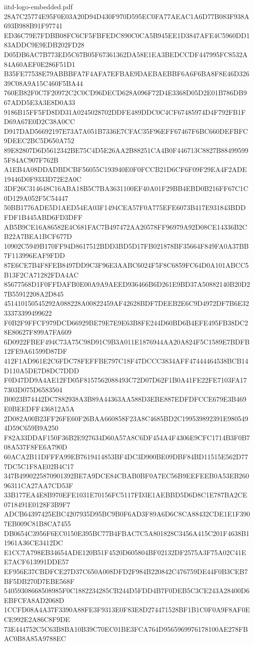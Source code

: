 \begin{filecontents*}[overwrite]{iitd-logo-embedded.pdf}
28A7C25774E95F0E03A20D94D430F970D595EC0FA77AEAC1A6D77B083F938A693B988B91F97741
ED36C79E7FDBB08FC6CF5FBFEDC890C0CA5B945EE1D3847AFE4C5960DD183ADDC9E9EDB202FD28
D05DB6AC7B773ED5C67B05F67361362DA58E1EA3BEDCCDF447995FC8532A84A60AEF0E286F51D1
B35FE77538E79ABBBFA7F4AFA7EFBAE9DAEBAEBBF6A6F6BA8F8E46D32639C08A9A15C460F5BA44
760EB82F0C7F20972C2C0CD96DECD628A096F72D4E3368D05D2E01B786DB967ADD5E3A3E8D0A33
9186B15FF5FD8DD31A0245028702DDFE489DDC0C4CF67485974D4F792FB1FD69A67E0D2C38A0CC
D917DAD56692197E73A7A051B7336E7CFAC35F96EFF67467F6BC660DEFBFC9DEEC2BC5D650A752
89E82807D6D5612342BE75C4D5E26AA2B88251CA4B0F446713C8827B884995995F84AC907F762B
A1EB4A08DDADBDCBF56055C193940E0F0FCCB21D6CF6F09F29EA4F2ADE19446D0F9333D72E2A0C
3DF26C314648C16ABA18B5C7BA3631100EF40A01F29BB4EBD0B216FF67C1C0D129A052F5C54447
50BB1776ADE5D1AED54EA03F1494CEA57F0A775EFE6073B417E931843BDDFDF1B445ABD6FD3DFF
AB5B9CE16A86582E4C681FAC7B497472AA20578FF96979A92D08CE14336B2CB22A7BEA1BCF677D
10902C5949B170FF94D8617512BDD3BD5D17FB021878BF35664F849FA0A37BB7F113996EAF9FDD
87E6CE7B4F8FEB8497DD9C3F96E3AABC6024F5F8C6859FC64D0A101ABCC5B13F2CA71282FDA4AC
85677568D1F0FFDAFB0E00A9A9AEED936466B6D261E9BD37A50882140B20D27B55912208A2D845
451410150545292A088228A00822459AF42628BDF7DEEB2E6C9D4972DF7B6E3233373399499622
F0B2F9FFCF979DCD66929BE79E7E9E63B8FE244D60BD6B4EFE495FB38DC28E80627F899A7FA609
6D0922FBEF494C73A75C98D91C9B3A011E1876944AA20A824F5C1589E7BDFB12FE9A61599D87DF
412F1AD961E2C6FDC78FEFFBE797C18F47DCCC3834AFF47444464538BCB14D110A5DE7D8DC7DDD
F0D47DD9A4AE12FD05F8157562088493C72D07D62F1B0A41FE22FE7103FA177303D075D6583504
B0023B74442DC7882938A3B89A44363AA588D3EBE887EDFDFCCE679E3B469E0BEEDFF436812A5A
2D082A00B23FF26FE60F26BAA660858F23A8C4685BD2C199539892391E9805494D59C659B9A250
F82A33DDAF150F36B2E927634D60A57A8C6DF454A4F4306E9CFC1714B3F0B708A537F8FE6A790D
60ACA2B11DFFFA99EB7619414853BF4DC3D900BE09DBF84BD11515E562D777DC5C1F8AE02B4C17
347B4990225870901392BE7A9DCE84CBAB0BF0A7EC56B9EEFEEB0A53EB26096311CA27AA7CD53F
33B177EA4E8B970EFE1031E70156FC5117FD3E1AEBBD5D6D8C1E787BA2CE0718491E0128F3B9F7
ADCB64397425EBC4207935D95BC9B0F6AD3F89A6D6C8CA88432CDE1E1F3907EB009C81B8CA7455
DB0654C3956F6EC0150E395BC77B4FBAC7C5A801828C3456A415C201F4638B11961A36CE3412DC
E1CC7A798EB34654ADE120B51F4520D605804BF02132DF2575A3F75A02C41EE7ACF613991DDE57
EF956E37CBDFCE27D37C650A008DFD2F984B220842C476759DE44F0B3CEB7BF5DB270D7EBE568F
54059308668508985F0C1882234285CB244D5FDD4B7F0DEB5C3CE243A28400D6EBFCFA8AD2068D
1CCFD08A4A37F3390A88FE3F9313E0F83E8D274471528BF1B1C0F0A9F8AF0ECE992E2A86C8F9DE
73E444752C5C63B8BA10B39C70EC01BE3FCA764D9565969976178100AE278FBAC0B8A85A9788EC

\end{filecontents*}
